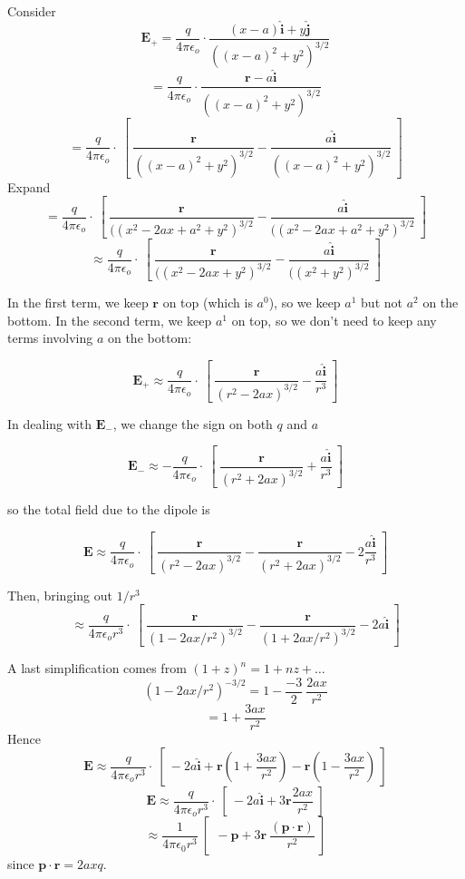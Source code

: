 \documentclass[11pt, oneside]{article}
\begin{document}
Consider 
\[ \mathbf{E}_+ = \frac{q}{4 \pi \epsilon_o} \cdot  \frac{(x - a) \hat{\mathbf{i}} + y \hat{\mathbf{j}}}{((x - a)^2 + y^2)^{3/2}} \]
\[ = \frac{q}{4 \pi \epsilon_o} \cdot  \frac{\mathbf{r} - a \hat{\mathbf{i}} }{((x - a)^2 + y^2)^{3/2}} \]
\[ = \frac{q}{4 \pi \epsilon_o} \cdot \ [ \  \frac{\mathbf{r} }{((x - a)^2 + y^2)^{3/2}} - \frac{a \hat{\mathbf{i}}}{((x - a)^2 + y^2)^{3/2}} \ ] \]
Expand
\[ = \frac{q}{4 \pi \epsilon_o} \cdot \ [ \  \frac{\mathbf{r} }{((x^2 - 2ax + a^2 + y^2)^{3/2}} - \frac{a \hat{\mathbf{i}}}{((x^2 - 2ax + a^2 + y^2)^{3/2}} \ ] \]
\[ \approx \frac{q}{4 \pi \epsilon_o} \cdot \ [ \  \frac{\mathbf{r} }{((x^2 - 2ax + y^2)^{3/2}} - \frac{a \hat{\mathbf{i}}}{((x^2 + y^2)^{3/2}} \ ] \]

In the first term, we keep $\mathbf{r}$ on top (which is $a^0$), so we keep $a^1$ but not $a^2$ on the bottom.   In the second term, we keep $a^1$ on top, so we don't need to keep any terms involving $a$ on the bottom:

\[ \mathbf{E}_+ \approx \frac{q}{4 \pi \epsilon_o} \cdot \ [ \  \frac{\mathbf{r} }{(r^2 - 2ax)^{3/2}} - \frac{a \hat{\mathbf{i}}}{r^3} \ ] \]

In dealing with $\mathbf{E}_-$, we change the sign on both $q$ and $a$

\[ \mathbf{E}_- \approx - \frac{q}{4 \pi \epsilon_o} \cdot \ [ \  \frac{\mathbf{r} }{(r^2 + 2ax)^{3/2}} + \frac{a \hat{\mathbf{i}}}{r^3} \ ] \]

so the total field due to the dipole is

\[ \mathbf{E} \approx \frac{q}{4 \pi \epsilon_o} \cdot \ [ \  \frac{\mathbf{r} }{(r^2 - 2ax)^{3/2}} -  \frac{\mathbf{r} }{(r^2 + 2ax)^{3/2}} - 2 \frac{a \hat{\mathbf{i}}}{r^3} \ ] \]

Then, bringing out $1/r^3$
\[ \approx \frac{q}{4 \pi \epsilon_o r^3} \cdot \ [ \  \frac{\mathbf{r} }{(1 - 2ax/r^2)^{3/2}} -  \frac{\mathbf{r} }{(1 + 2ax/r^2)^{3/2}} - 2 a \hat{\mathbf{i}} \ ] \]

A last simplification comes from $(1 + z)^n = 1 + nz + \dots$
\[ (1 - 2ax/r^2)^{-3/2} = 1 - \frac{-3}{2} \ \frac{2ax}{r^2} \]
\[ = 1 +  \frac{3ax}{r^2} \]
Hence
\[ \mathbf{E} \approx \frac{q}{4 \pi \epsilon_o r^3} \cdot \ [ \ - 2 a \hat{\mathbf{i}} + \mathbf{r} (1 + \frac{3ax}{r^2}) - \mathbf{r} (1 - \frac{3ax}{r^2}) \ ] \]
\[ \mathbf{E} \approx \frac{q}{4 \pi \epsilon_o r^3} \cdot \ [ \ - 2 a \hat{\mathbf{i}} + 3 \mathbf{r} \frac{2ax}{r^2} \ ] \]
\[ \approx \frac{1}{4 \pi \epsilon_0 r^3} \ [ \  \ - \mathbf{p} + 3 \mathbf{r} \ \frac{(\mathbf{p} \cdot \mathbf{r} )}{r^2} \ ] \]
since $\mathbf{p} \cdot \mathbf{r} = 2axq$.
\end{document}
